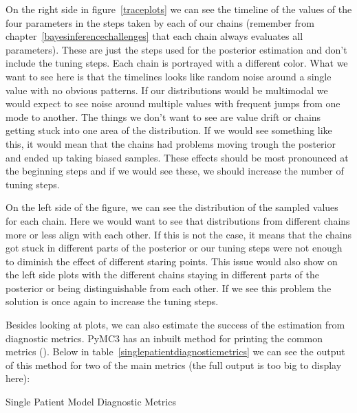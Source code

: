 \documentclass[12pt,a4paper,leqno]{report}
\theoremstyle{plain}
\theoremstyle{definition}
\theoremstyle{remark}
\begin{document}
On the right side in figure\ \ref{traceplots} we can see the timeline of the values of the
four parameters in the steps taken by each of our
chains (remember from chapter\ \ref{bayesinferencechallenges} that
each chain always evaluates all parameters). These are just the steps used for the
posterior estimation and don't include the
tuning steps. Each chain is portrayed with a different color. What we want to see
here is that the timelines looks like random noise around a single value with no obvious
patterns. If our distributions would be multimodal we would expect to see noise around
multiple values with frequent jumps from one mode to another. The things
we don't want to see are value drift or chains getting stuck into one area of the
distribution. If we would see something like this,
it would mean that the chains had problems moving trough the posterior and ended up
taking biased samples. These effects should be most pronounced at the beginning
steps and if we would see these, we should increase the number of tuning
steps.

On the left side of the figure, we can see the distribution of the sampled values for
each chain. Here we would want to see that distributions from different chains more or
less align with
each other. If this is not the case, it means that the chains got stuck in different
parts of the posterior or our tuning steps were not enough to diminish the effect of
different staring points. This issue would also show on the left side plots with the different
chains staying in different parts of the posterior or being distinguishable from each
other. If we see this problem the solution is once again to increase the tuning steps.

Besides looking at plots, we can also estimate the success of the estimation from
diagnostic metrics. PyMC3 has an inbuilt method for printing the common metrics
(). Below in table\ \ref{singlepatientdiagnosticmetrics} we can see the output
of this method for two of the main metrics (the full output is too big to display here):

\bigskip
\begin{table}[H]
    \caption{Single Patient Model Diagnostic Metrics}\label{singlepatientdiagnosticmetrics}
    \bigskip
    \centering
    
\end{table}
\smallskip
\end{document}
